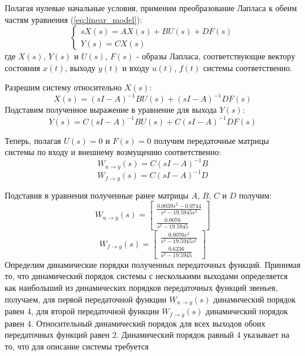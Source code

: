 Полагая нулевые начальные условия, применим преобразование Лапласа к обеим частям уравнения (\ref{eq:linear_model}): 
\begin{equation}
    \begin{cases}
        sX(s) = AX(s) + BU(s) + DF(s) \\ 
        Y(s) = CX(s)
    \end{cases}
\end{equation}
где $X(s)$, $Y(s)$ и $U(s)$, $F(s)$ - образы Лапласа, соответствующие вектору состояния $x(t)$, выходу $y(t)$ и входу $u(t)$, $f(t)$ системы соответственно.

Разрешим систему относительно $X(s)$:
\begin{equation}
    X(s) = (sI - A)^{-1}BU(s) + (sI - A)^{-1}DF(s)
\end{equation}
Подставим полученное выражение в уравнение для выхода $Y(s)$:
\begin{equation}
    Y(s) = C(sI - A)^{-1}BU(s) + C(sI - A)^{-1}DF(s)
\end{equation}

Теперь, полагая $U(s) = 0$ и $F(s) = 0$ получим передаточные матрицы системы по входу и внешнему возмущению соответственно:
\begin{equation}
    W_{u\rightarrow y}(s) = C(sI - A)^{-1}B
\end{equation}
\begin{equation}
    W_{f\rightarrow y}(s) = C(sI - A)^{-1}D
\end{equation}

Подставив в уравнения полученные ранее матрицы $A$, $B$, $C$ и $D$ получим: 
\begin{equation}
    W_{u \rightarrow y}(s) = \begin{bmatrix}
    \frac{0.0039s^2 - 0.0744}{s^4 - 19.5945s^2} \\ 
    \frac{0.0076}{s^2 - 19.5945}
    \end{bmatrix}
\end{equation}
\begin{equation}
    W_{f \rightarrow y}(s) = \begin{bmatrix}
    \frac{0.0076s^2}{s^4 - 19.5945s^2} \\ 
    \frac{0.6236}{s^2 - 19.5945}
    \end{bmatrix}
\end{equation}
Определим динамические порядки полученных передаточных функций. 
Принимая то, что динамический порядок системы с несколькими выходами определяется как 
наибольший из динамических порядков передаточных функций звеньев, получаем, 
для первой передаточной функции $W_{u \rightarrow y}(s)$ динамический порядок равен 4, 
для второй передаточной функции $W_{f \rightarrow y}(s)$ динамический порядок равен 4. 
Относительный динамический порядок для всех выходов обоих передаточных функций равен 2. 
Динамический порядок равный 4 указывает на то, что для описание системы требуется 

